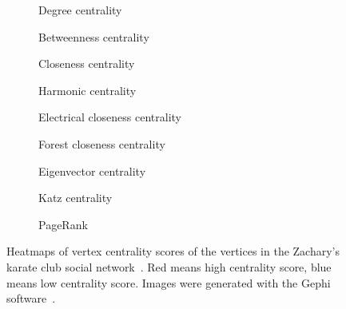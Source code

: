 \begin{figure}[t!]
\centering
\begin{subfigure}[t]{.45\textwidth}
\centering

\caption{Degree centrality}
\label{fig:karate-degree}
\end{subfigure}\hfill
%
\begin{subfigure}[t]{.45\textwidth}
\centering

\caption{Betweenness centrality}
\label{fig:karate-betw}
\end{subfigure}\smallskip

\begin{subfigure}[t]{.45\textwidth}
\centering

\caption{Closeness centrality}
\label{fig:karate-clos}
\end{subfigure}\hfill
%
\begin{subfigure}[t]{.45\textwidth}
\centering

\caption{Harmonic centrality}
\label{fig:karate-harmonic}
\end{subfigure}\smallskip

\begin{subfigure}[t]{.45\textwidth}
\centering

\caption{Electrical closeness centrality}
\end{subfigure}\hfill
%
\begin{subfigure}[t]{.45\textwidth}
\centering

\caption{Forest closeness centrality}
\end{subfigure}\smallskip

\begin{subfigure}[t]{.45\textwidth}
\centering

\caption{Eigenvector centrality}
\end{subfigure}\hfill
%
\begin{subfigure}[t]{.45\textwidth}
\centering

\caption{Katz centrality}
\end{subfigure}\smallskip

\begin{subfigure}[t]{.45\textwidth}
\centering

\caption{PageRank}
\end{subfigure}

\caption{Heatmaps of vertex centrality scores of the vertices in the
Zachary's karate club social network~\cite{zachary1977information}.
Red means high centrality score, blue means low centrality score. Images were
generated with the Gephi software~\cite{DBLP:conf/icwsm/BastianHJ09}.}
\label{fig:karate-centrality}
\end{figure}


